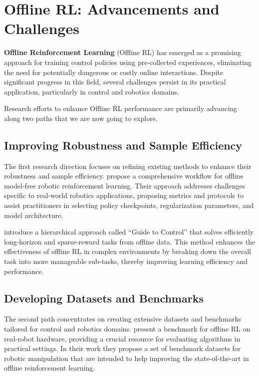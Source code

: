 \section{Offline RL: Advancements and Challenges}

\textbf{Offline Reinforcement Learning} (Offline RL)
has emerged as a promising approach for training control
policies using pre-collected experiences,
eliminating the need for potentially dangerous or
costly online interactions. Despite significant progress
in this field, several challenges persist in
its practical application, particularly in control
and robotics domains.

Research efforts to enhance Offline RL performance are
primarily advancing along two paths that we
are now going to explore.

\subsection{Improving Robustness and Sample Efficiency}

The first research direction focuses on refining
existing methods to enhance their robustness and
sample efficiency. \cite{kumar2021} propose a comprehensive
workflow for offline model-free robotic reinforcement
learning. Their approach addresses challenges specific
to real-world robotics applications, proposing
metrics and protocols to assist practitioners in
selecting policy checkpoints, regularization parameters,
and model architecture.

\cite{ijcai2023} introduce a hierarchical approach called
``Guide to Control'' that solves efficiently long-horizon
and sparse-reward tasks from offline data.
This method enhances the effectiveness
of offline RL in complex environments by breaking down the overall
task into more manageable sub-tasks, thereby improving learning
efficiency and performance.

\subsection{Developing Datasets and Benchmarks}

The second path concentrates on creating extensive datasets
and benchmarks tailored for control and robotics domains.
\cite{gurtler2023} present a benchmark for offline RL
on real-robot hardware, providing a crucial resource for
evaluating algorithms in practical settings.
In their work they propose a set of
benchmark datasets for robotic manipulation
that are intended to help improving the
state-of-the-art in offline reinforcement learning.

